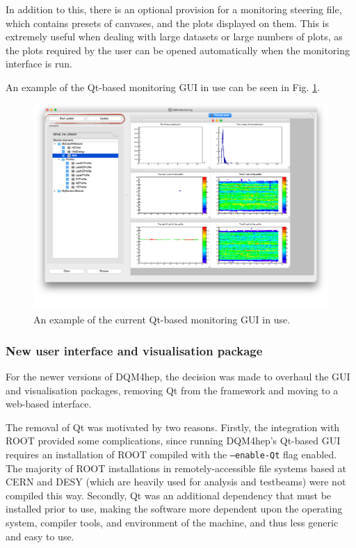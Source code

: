 In addition to this, there is an optional provision for a monitoring steering file, which contains presets of canvases, and the plots displayed on them. This is extremely useful when dealing with large datasets or large numbers of plots, as the plots required by the user can be opened automatically when the monitoring interface is run.

An example of the Qt-based monitoring \acrshort{GUI} in use can be seen in Fig. \ref{figure:daq/dqm4hep/old-gui}. 

\begin{figure}[h]
	\centering
	\includegraphics[width=1.0\textwidth]{../Pictures/DQM4hepMonitoringGui.png}
	\caption{An example of the current Qt-based monitoring \acrshort{GUI} in use.}
	\label{figure:daq/dqm4hep/old-gui}
\end{figure}

\subsubsection{New user interface and visualisation package}
For the newer versions of \acrshort{DQM4hep}, the decision was made to overhaul the \acrshort{GUI} and visualisation packages, removing Qt from the framework and moving to a web-based interface.

The removal of Qt was motivated by two reasons. Firstly, the integration with ROOT provided some complications, since running \acrshort{DQM4hep}'s Qt-based \acrshort{GUI} requires an installation of ROOT compiled with the \texttt{--enable-Qt} flag enabled. The majority of ROOT installations in remotely-accessible file systems based at \acrshort{CERN} and \acrshort{DESY} (which are heavily used for analysis and testbeams) were not compiled this way. Secondly, Qt was an additional dependency that must be installed prior to use, making the software more dependent upon the operating system, compiler tools, and environment of the machine, and thus less generic and easy to use. %

